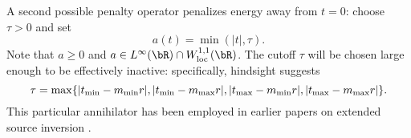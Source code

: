 A second possible 
penalty operator penalizes energy away from 
$t=0$: choose $\tau > 0$ and set 
\begin{equation}
  \label{eqn:ann}
  a(t) = \min(|t|, \tau). 
\end{equation}
Note that $a \ge 0$ and $a \in L^{\infty}(\bR) \cap W^{1,1}_{\rm
  loc}(\bR)$. The cutoff $\tau$ will be chosen large enough to be effectively inactive: 
specifically, hindsight suggests 
\begin{equation}
  \label{eqn:taudef}
  \tau = \max\{|t_{\rm min}-m_{\rm min}r|,|t_{\rm min}-m_{\rm max}r|, |t_{\rm max}-m_{\rm min}r|, |t_{\rm max}-m_{\rm max}r|\}. 
\end{equation}
This 
particular annihilator has been employed in earlier papers on extended 
source inversion 
\cite[]{Plessix:00a,LuoSava:11,Warner:14,HuangSymes:SEG15a,Warner:16,HuangSymes:GEO17}.

